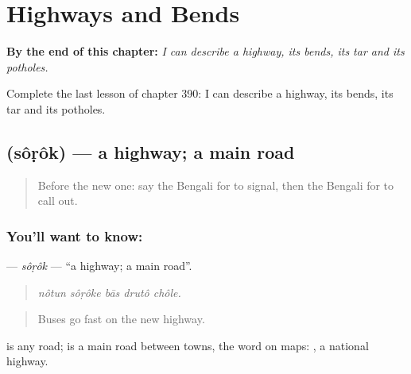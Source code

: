 
\chapter{Highways and Bends}
\label{ch:bn-highways-and-bends}

\begin{chapteropening}
\textbf{By the end of this chapter:} \emph{I can describe a highway, its bends, its tar and its potholes.}

Complete the last lesson of chapter 390: I can describe a highway, its bends, its tar and its potholes.
\end{chapteropening}

\section[\texorpdfstring{\bn{সড়ক} (sôṛôk)}{সড়ক (sôṛôk)}]{ (sôṛôk) — a highway; a main road}

\label{lesson:BN-C390-sorok}



\begin{quote}
Before the new one: say the Bengali for to signal, then the Bengali for to call out.
\end{quote}

\subsection*{You'll want to know: }
\textbf{} — \emph{sôṛôk} — \textquotedblleft{}a highway; a main road\textquotedblright{}.

\begin{quote}
    
\end{quote}

\begin{quote}
\emph{nôtun sôṛôke bās drutô chôle.}
\end{quote}

\begin{quote}
Buses go fast on the new highway.
\end{quote}

 is any road;  is a main road between towns, the word on maps:  , a national highway.

